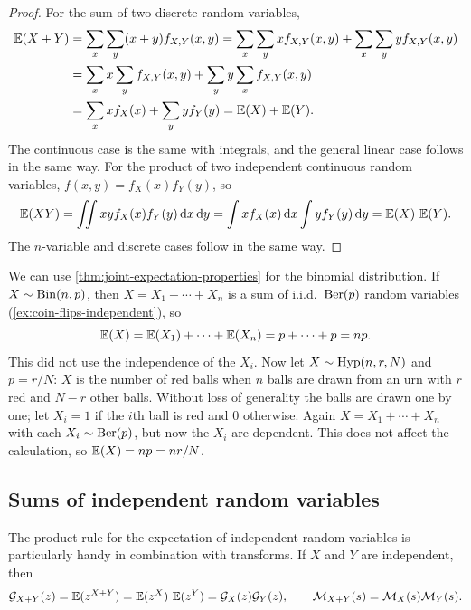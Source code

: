 \begin{proof}
For the sum of two discrete random variables,
\begin{align*}
  \operatorname{\mathbb{E}}(X + Y) &= \sum_x \sum_y (x + y) f_{X,Y}(x, y) = \sum_x \sum_y x f_{X,Y}(x, y) + \sum_x \sum_y y f_{X,Y}(x, y) \\
  &= \sum_x x \sum_y f_{X,Y}(x, y) + \sum_y y \sum_x f_{X,Y}(x, y) \\
  &= \sum_x x f_X(x) + \sum_y y f_Y(y) = \operatorname{\mathbb{E}}(X) + \operatorname{\mathbb{E}}(Y).
\end{align*}
The continuous case is the same with integrals, and the general linear case follows in the same way. For the product of two independent continuous random variables, $f(x, y) = f_X(x) f_Y(y)$, so
\[
  \operatorname{\mathbb{E}}(XY) = \iint x y f_X(x) f_Y(y) \mathop{}\!\mathrm{d} x \mathop{}\!\mathrm{d} y = \int x f_X(x) \mathop{}\!\mathrm{d} x \int y f_Y(y) \mathop{}\!\mathrm{d} y = \operatorname{\mathbb{E}}(X) \, \operatorname{\mathbb{E}}(Y).
\]
The $n$-variable and discrete cases follow in the same way.
\end{proof}

\begin{example}\label{ex:binomial-hypergeometric-expectation}
We can use \cref{thm:joint-expectation-properties} for the binomial distribution. If $X \sim \mathrm{Bin}(n, p)$, then $X = X_1 + \cdots + X_n$ is a sum of i.i.d.\ $\mathrm{Ber}(p)$ random variables (\cref{ex:coin-flips-independent}), so
\[
  \operatorname{\mathbb{E}}(X) = \operatorname{\mathbb{E}}(X_1) + \cdots + \operatorname{\mathbb{E}}(X_n) = p + \cdots + p = np.
\]
This did not use the independence of the $X_i$. Now let $X \sim \mathrm{Hyp}(n, r, N)$ and $p = r/N$: $X$ is the number of red balls when $n$ balls are drawn from an urn with $r$ red and $N - r$ other balls. Without loss of generality the balls are drawn one by one; let $X_i = 1$ if the $i$th ball is red and 0 otherwise. Again $X = X_1 + \cdots + X_n$ with each $X_i \sim \mathrm{Ber}(p)$, but now the $X_i$ are dependent. This does not affect the calculation, so $\operatorname{\mathbb{E}}(X) = np = nr/N$.
\end{example}

\subsection{Sums of independent random variables}\label{sec:sums-transforms}

The product rule for the expectation of independent random variables is particularly handy in combination with transforms. If $X$ and $Y$ are independent, then
\[
  \mathcal{G}_{X+Y}(z) = \operatorname{\mathbb{E}}(z^{X+Y}) = \operatorname{\mathbb{E}}(z^X) \, \operatorname{\mathbb{E}}(z^Y) = \mathcal{G}_X(z) \mathcal{G}_Y(z), \qquad \mathcal{M}_{X+Y}(s) = \mathcal{M}_X(s) \mathcal{M}_Y(s).
\]

